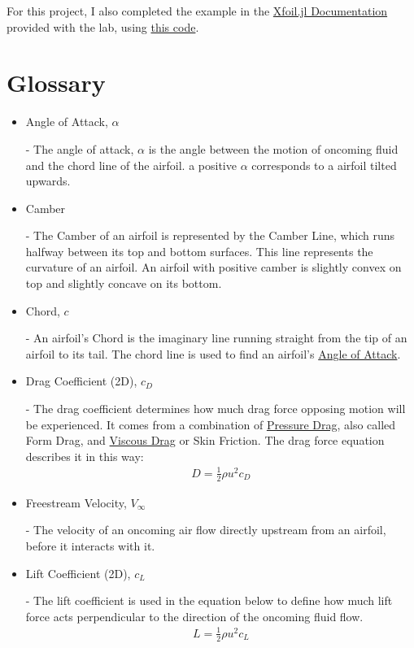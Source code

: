 \documentclass{article}
\begin{document}
For this project, I also completed the example in the \href{https://flow.byu.edu/Xfoil.jl/stable/}{Xfoil.jl Documentation} provided with the lab, using \href{https://github.com/JoeSpencer1/497R-Projects/blob/Airfoil-Analysis/Demo.jl}{this code}.

\clearpage

\section{Glossary}
\begin{itemize}
		
	\item \hypertarget{alpha}{Angle of Attack, $\alpha$} - The angle of attack, $\alpha$ is the angle between the motion of oncoming fluid and the chord line of the airfoil. a positive $\alpha$ corresponds to a airfoil tilted upwards.
	
	\item \hypertarget{Camber}{Camber} - The Camber of an airfoil is represented by the Camber Line, which runs halfway between its top and bottom surfaces. This line represents the curvature of an airfoil. An airfoil with positive camber is slightly convex on top and slightly concave on its bottom.
	
	\item \hypertarget{c}{Chord, $c$} - An airfoil's Chord is the imaginary line running straight from the tip of an airfoil to its tail. The chord line is used to find an airfoil's \hyperlink{alpha}{Angle of Attack}.

	\item \hypertarget{CD}{Drag Coefficient (2D), $c_{D}$} - The drag coefficient determines how much drag force opposing motion will be experienced. It comes from a combination of \hyperlink{DP}{Pressure Drag}, also called Form Drag, and \hyperlink{VD}{Viscous Drag} or Skin Friction. The drag force equation describes it in this way: 
		\begin{equation} \label{eq:13}
		\begin{aligned}
        			D = \frac{1}{2} \rho u^{2} c_{D}
	    	\end{aligned}
		\end{equation}
	
	\item \hypertarget{Vinf}{Freestream Velocity, $V_{\infty}$} - The velocity of an oncoming air flow directly upstream from an airfoil, before it interacts with it.
		
	\item \hypertarget{CL}{Lift Coefficient (2D), $c_{L}$} - The lift coefficient is used in the equation below to define how much lift force acts perpendicular to the direction of the oncoming fluid flow.
		\begin{equation} \label{eq:14}
		\begin{aligned}
        			L = \frac{1}{2} \rho u^{2} c_{L}
	    	\end{aligned}
		\end{equation}
	

\end{itemize}
\end{document}
